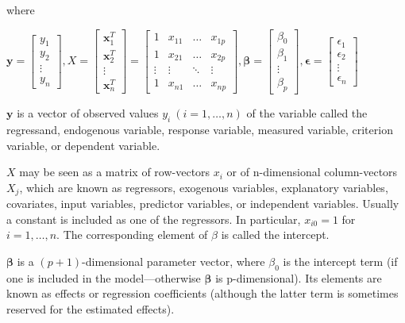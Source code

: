 \documentclass{article}
\begin{document}
\noindent where

\bigskip

\(
\textbf{y} = 
\begin{bmatrix}
y_1\\
y_2\\
\vdots\\
y_n
\end{bmatrix}
,
X = 
\begin{bmatrix}
\textbf{x}_1^T\\
\textbf{x}_2^T\\
\vdots\\
\textbf{x}_n^T
\end{bmatrix} = 
\begin{bmatrix}
1 & x_{11} & \dots & x_{1p}\\
1 & x_{21} & \dots & x_{2p}\\
\vdots & \vdots & \ddots & \vdots\\
1 & x_{n1} & \dots & x_{np}
\end{bmatrix}
,
\boldsymbol{\beta} = 
\begin{bmatrix}
\beta_0\\
\beta_1\\
\vdots\\
\beta_p
\end{bmatrix}
,
\boldsymbol{\epsilon} = 
\begin{bmatrix}
\epsilon_1\\
\epsilon_2\\
\vdots\\
\epsilon_n
\end{bmatrix}
\)

\bigskip

\noindent \(\textbf{y}\) is a vector of observed values \(y_{i}\ (i=1,\ldots ,n)\) of the variable called the regressand, endogenous variable, response variable, measured variable, criterion variable, or dependent variable.

\bigskip

\noindent \(X\) may be seen as a matrix of row-vectors \(x_{i}\) or of n-dimensional column-vectors \(X_{j}\), which are known as regressors, exogenous variables, explanatory variables, covariates, input variables, predictor variables, or independent variables. Usually a constant is included as one of the regressors. In particular, \(x_{i0} = 1\) for \(i = 1, \dots, n\). The corresponding element of \(\beta\) is called the intercept. 

\bigskip

\noindent \(\boldsymbol{\beta}\) is a \((p + 1)\)-dimensional parameter vector, where \(\beta_{0}\) is the intercept term (if one is included in the model—otherwise \(\boldsymbol{\beta}\) is p-dimensional). Its elements are known as effects or regression coefficients (although the latter term is sometimes reserved for the estimated effects).
\end{document}
